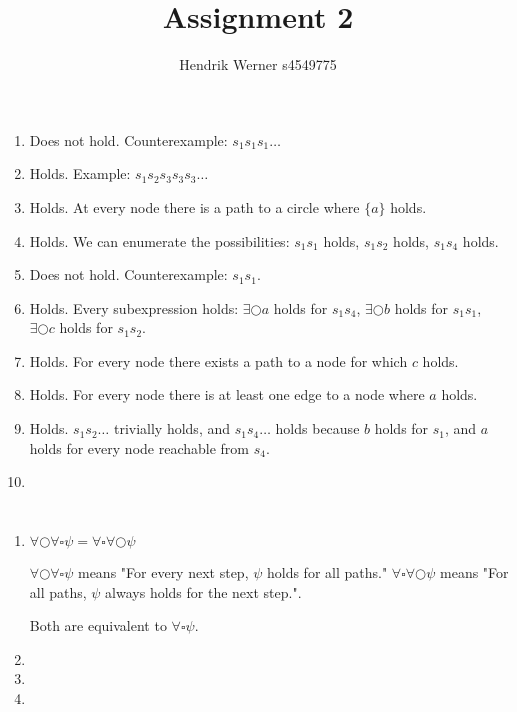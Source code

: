 \documentclass[12pt, a4paper]{article}
\title{Assignment 2}
\author{Hendrik Werner s4549775}
\begin{document}
\maketitle

\section{} %
\begin{enumerate}[a]
	\item %
	Does not hold. Counterexample: $s_1 s_1 s_1 \dots$
	\item %
	Holds. Example: $s_1 s_2 s_3 s_3 s_3 \dots$
	\item %
	Holds. At every node there is a path to a circle where $\{a\}$ holds.
	\item %
	Holds. We can enumerate the possibilities: $s_1 s_1$ holds, $s_1 s_2$ holds, $s_1 s_4$ holds.
	\item %
	Does not hold. Counterexample: $s_1 s_1$.
	\item %
	Holds. Every subexpression holds: $\exists \bigcirc a$ holds for $s_1 s_4$, $\exists \bigcirc b$ holds for $s_1 s_1$, $\exists \bigcirc c$ holds for $s_1 s_2$.
	\item %
	Holds. For every node there exists a path to a node for which $c$ holds.
	\item %
	Holds. For every node there is at least one edge to a node where $a$ holds.
	\item %
	Holds. $s_1 s_2 \dots$ trivially holds, and $s_1 s_4 \dots$ holds because $b$ holds for $s_1$, and $a$ holds for every node reachable from $s_4$.
	\item %
\end{enumerate}

\section{} %
\begin{enumerate}[a]
	\item %
	$\forall \bigcirc \forall \square \psi = \forall \square \forall \bigcirc \psi$

	$\forall \bigcirc \forall \square \psi$ means "For every next step, $\psi$ holds for all paths." $\forall \square \forall \bigcirc \psi$ means "For all paths, $\psi$ always holds for the next step.".

	Both are equivalent to $\forall \square \psi$.
	\item %
	\item %
	\item %
\end{enumerate}
\end{document}
